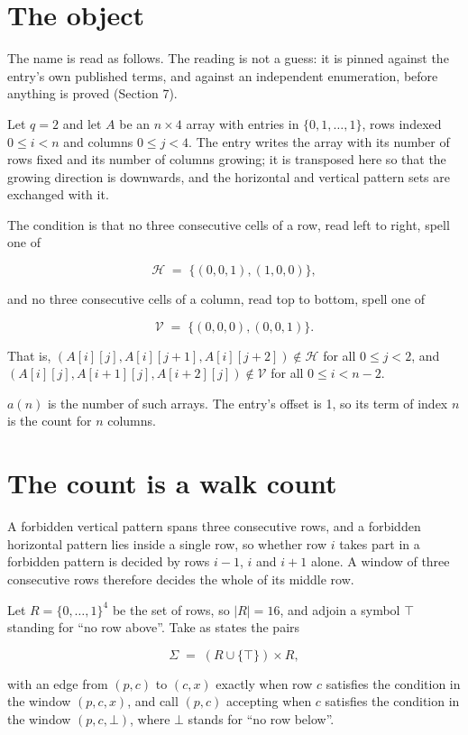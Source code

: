 \documentclass[11pt]{article}
\theoremstyle{definition}
\begin{document}
\section{The object}

The name is read as follows. The reading is not a guess: it is pinned against the entry's own published terms, and against an independent enumeration, before anything is proved (Section 7).

Let $q = 2$ and let $A$ be an $n \times 4$ array with entries in $\{0,1,\dots,1\}$, rows indexed $0 \le i < n$ and columns $0 \le j < 4$. The entry writes the array with its number of rows fixed and its number of columns growing; it is transposed here so that the growing direction is downwards, and the horizontal and vertical pattern sets are exchanged with it.

The condition is that no three consecutive cells of a row, read left to right, spell one of

\[\mathcal{H} \;=\; \{(0,0,1), (1,0,0)\},\]

and no three consecutive cells of a column, read top to bottom, spell one of

\[\mathcal{V} \;=\; \{(0,0,0), (0,0,1)\}.\]

That is, $(A[i][j],A[i][j{+}1],A[i][j{+}2]) \notin \mathcal{H}$ for all $0 \le j < 2$, and $(A[i][j],A[i{+}1][j],A[i{+}2][j]) \notin \mathcal{V}$ for all $0 \le i < n-2$.

$a(n)$ is the number of such arrays. The entry's offset is 1, so its term of index $n$ is the count for $n$ columns.

\section{The count is a walk count}

A forbidden vertical pattern spans three consecutive rows, and a forbidden horizontal pattern lies inside a single row, so whether row $i$ takes part in a forbidden pattern is decided by rows $i-1$, $i$ and $i+1$ alone. A window of three consecutive rows therefore decides the whole of its middle row.

Let $R = \{0,\dots,1\}^{4}$ be the set of rows, so $|R| = 16$, and adjoin a symbol $\top$ standing for ``no row above''. Take as states the pairs

\[\Sigma \;=\; (R \cup \{\top\}) \times R,\]

with an edge from $(p,c)$ to $(c,x)$ exactly when row $c$ satisfies the condition in the window $(p,c,x)$, and call $(p,c)$ accepting when $c$ satisfies the condition in the window $(p,c,\bot)$, where $\bot$ stands for ``no row below''.
\end{document}
